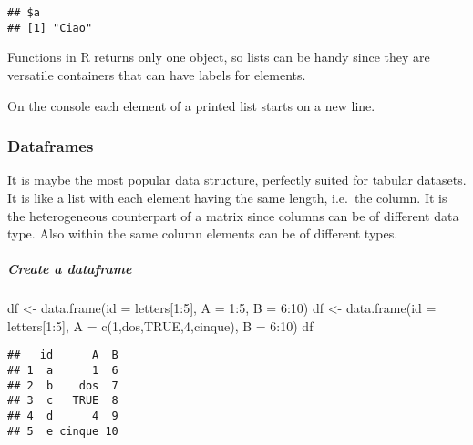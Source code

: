 \documentclass[
]{article}
\newenvironment{Shaded}{\begin{snugshade}}{\end{snugshade}}
\newcommand{\AttributeTok}[1]{\textcolor[rgb]{0.77,0.63,0.00}{#1}}
\newcommand{\ConstantTok}[1]{\textcolor[rgb]{0.00,0.00,0.00}{#1}}
\newcommand{\DecValTok}[1]{\textcolor[rgb]{0.00,0.00,0.81}{#1}}
\newcommand{\FunctionTok}[1]{\textcolor[rgb]{0.00,0.00,0.00}{#1}}
\newcommand{\NormalTok}[1]{#1}
\newcommand{\OtherTok}[1]{\textcolor[rgb]{0.56,0.35,0.01}{#1}}
\newcommand{\SpecialCharTok}[1]{\textcolor[rgb]{0.00,0.00,0.00}{#1}}
\newcommand{\StringTok}[1]{\textcolor[rgb]{0.31,0.60,0.02}{#1}}
\begin{document}
\begin{verbatim}
## $a
## [1] "Ciao"
\end{verbatim}

Functions in R returns only one object, so lists can be handy since they
are versatile containers that can have labels for elements.

On the console each element of a printed list starts on a new line.

\hypertarget{dataframes}{%
\subsubsection{Dataframes}\label{dataframes}}

It is maybe the most popular data structure, perfectly suited for
tabular datasets. It is like a list with each element having the same
length, i.e.~the column. It is the heterogeneous counterpart of a matrix
since columns can be of different data type. Also within the same column
elements can be of different types.

\hypertarget{create-a-dataframe}{%
\subparagraph{Create a dataframe}\label{create-a-dataframe}}

\begin{Shaded}
\begin{Highlighting}[]
\NormalTok{df }\OtherTok{\textless{}{-}} \FunctionTok{data.frame}\NormalTok{(}\AttributeTok{id =}\NormalTok{ letters[}\DecValTok{1}\SpecialCharTok{:}\DecValTok{5}\NormalTok{], }\AttributeTok{A =} \DecValTok{1}\SpecialCharTok{:}\DecValTok{5}\NormalTok{, }\AttributeTok{B =} \DecValTok{6}\SpecialCharTok{:}\DecValTok{10}\NormalTok{)}
\NormalTok{df }\OtherTok{\textless{}{-}} \FunctionTok{data.frame}\NormalTok{(}\AttributeTok{id =}\NormalTok{ letters[}\DecValTok{1}\SpecialCharTok{:}\DecValTok{5}\NormalTok{], }\AttributeTok{A =} \FunctionTok{c}\NormalTok{(}\DecValTok{1}\NormalTok{,}\StringTok{\textquotesingle{}dos\textquotesingle{}}\NormalTok{,}\ConstantTok{TRUE}\NormalTok{,}\DecValTok{4}\NormalTok{,}\StringTok{\textquotesingle{}cinque\textquotesingle{}}\NormalTok{), }\AttributeTok{B =} \DecValTok{6}\SpecialCharTok{:}\DecValTok{10}\NormalTok{)}
\NormalTok{df}
\end{Highlighting}
\end{Shaded}

\begin{verbatim}
##   id      A  B
## 1  a      1  6
## 2  b    dos  7
## 3  c   TRUE  8
## 4  d      4  9
## 5  e cinque 10
\end{verbatim}
\end{document}
